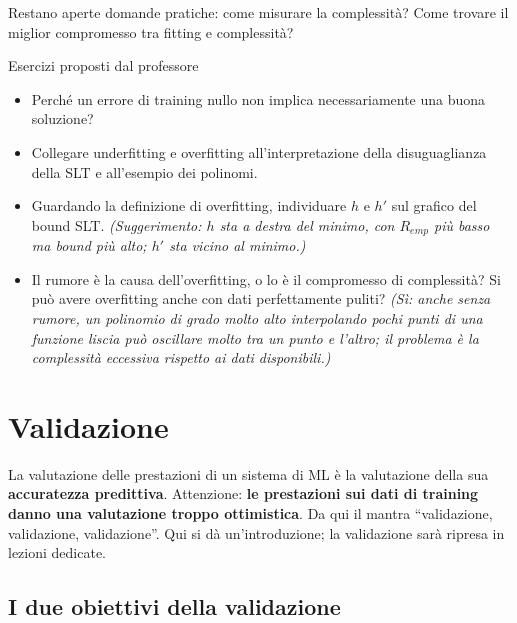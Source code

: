Restano aperte domande pratiche: come misurare la complessità? Come
trovare il miglior compromesso tra fitting e complessità?

\begin{boxquestion}{Esercizi proposti dal professore}

\begin{itemize}
\tightlist
\item
  Perché un errore di training nullo non implica necessariamente una
  buona soluzione?
\item
  Collegare underfitting e overfitting all'interpretazione della
  disuguaglianza della SLT e all'esempio dei polinomi.
\item
  Guardando la definizione di overfitting, individuare \(h\) e \(h'\)
  sul grafico del bound SLT. \emph{(Suggerimento: \(h\) sta a destra del
  minimo, con \(R_{emp}\) più basso ma bound più alto; \(h'\) sta vicino
  al minimo.)}
\item
  Il rumore è la causa dell'overfitting, o lo è il compromesso di
  complessità? Si può avere overfitting anche con dati perfettamente
  puliti? \emph{(Sì: anche senza rumore, un polinomio di grado molto
  alto interpolando pochi punti di una funzione liscia può oscillare
  molto tra un punto e l'altro; il problema è la complessità eccessiva
  rispetto ai dati disponibili.)}
\end{itemize}

\end{boxquestion}

\section{Validazione}\label{validazione}

La valutazione delle prestazioni di un sistema di ML è la valutazione
della sua \textbf{accuratezza predittiva}. Attenzione: \textbf{le
prestazioni sui dati di training danno una valutazione troppo
ottimistica}. Da qui il mantra ``validazione, validazione,
validazione''. Qui si dà un'introduzione; la validazione sarà ripresa in
lezioni dedicate.

\subsection{I due obiettivi della
validazione}\label{i-due-obiettivi-della-validazione}

